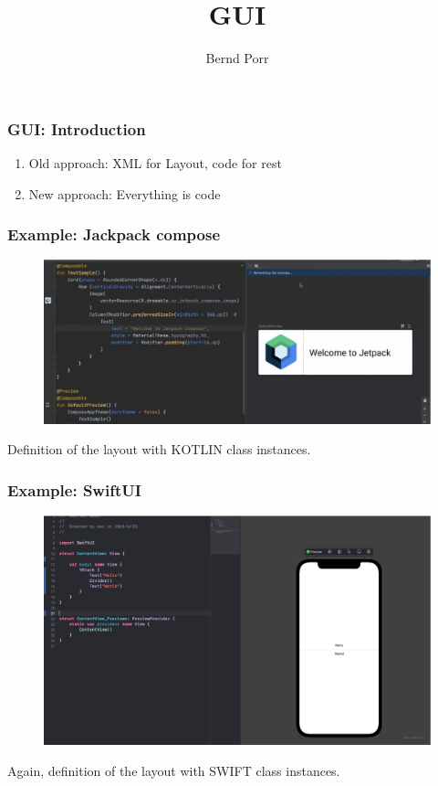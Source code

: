 \documentclass[xcolor=dvipsnames]{beamer}
\date{}
\title{GUI}
\author{Bernd Porr}
\begin{document}
\begin{frame}
\titlepage
\end{frame}




\begin{frame}[fragile]
  \frametitle{GUI: Introduction}

  \begin{enumerate}
  \item Old approach: XML for Layout, code for rest
  \item New approach: Everything is code
  \end{enumerate}
  
\end{frame}



\begin{frame}[fragile]
\frametitle{Example: Jackpack compose}
\begin{figure}[!hbt]
\begin{center}
\mbox{\includegraphics[width=\textwidth]{jetpack}}
\end{center}
\end{figure}
Definition of the layout with KOTLIN class instances.
\end{frame}



  
\begin{frame}[fragile]
  \frametitle{Example: SwiftUI}
\begin{figure}[!hbt]
\begin{center}
\mbox{\includegraphics[width=\textwidth]{swiftui}}
\end{center}
\end{figure}
Again, definition of the layout with SWIFT class instances.
\end{frame}
\end{document}
